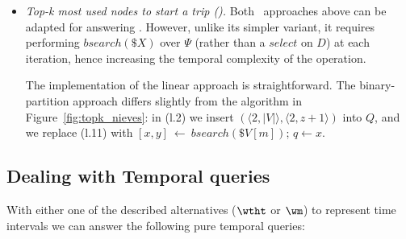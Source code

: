 \begin{itemize}[leftmargin=3mm]
\item {\em Top-k most used nodes to start a trip (\Stks).}
Both \Stk\ approaches above can be adapted for answering \Stks.
However, unlike its simpler variant, it requires performing $bsearch(\$X)$ over $\Psi$ (rather than a $select$ on $D$) at
each iteration, hence increasing the temporal complexity of the operation.

The implementation of the linear approach is straightforward. The binary-partition approach differs slightly 
from the algorithm in Figure~\ref{fig:topk_nieves}: in (l.2) we insert $(\langle 2, |V| \rangle, \langle 2,z+1 \rangle)$ into $Q$, and we 
replace (l.11) with $[x,y]~\leftarrow~bsearch(\$V[m])$; $q \leftarrow x$.


\end{itemize}

\subsection{Dealing with Temporal queries}
\label{sec:tq}
With either one of the described alternatives ($\wtht$ or $\wm$) to represent time intervals
we can answer the following pure temporal queries:

